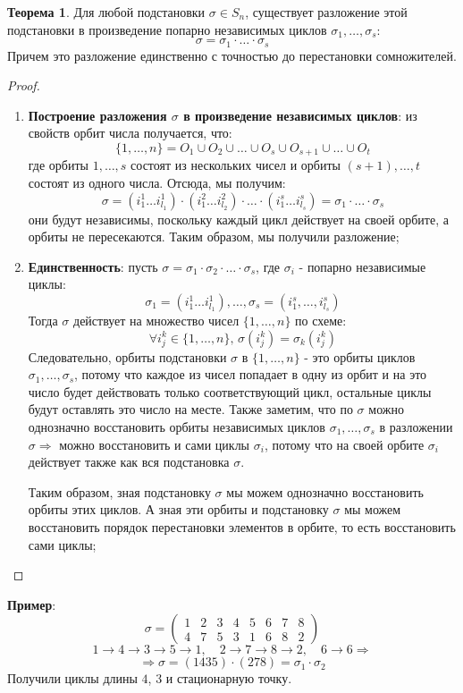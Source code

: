 \documentclass[12pt]{article}
\theoremstyle{definition}
\newtheorem{theorem}{Теорема}
\begin{document}
\begin{theorem}
	Для любой подстановки $\sigma \in S_n$, существует разложение этой подстановки в произведение попарно независимых циклов $\sigma_1, \dotsc,\sigma_s$: 
	$$
		\sigma = \sigma_1{\cdot}\dotsc{\cdot}\sigma_s
	$$
	Причем это разложение единственно с точностью до перестановки сомножителей.
\end{theorem}
\begin{proof}\hfill
	\begin{enumerate}[label=\arabic*)]
		\item \textbf{Построение разложения $\sigma$ в произведение независимых циклов}: из свойств орбит числа получается, что: 
		$$
			\{1,\dotsc,n\} = O_1 \cup O_2 \cup \dotsc \cup O_s \cup O_{s+1} \cup \dotsc \cup O_t
		$$ 
		где орбиты $1,\dotsc, s$ состоят из нескольких чисел и орбиты $(s+1), \dotsc, t$ состоят из одного числа. Отсюда, мы получим:
		$$
			\sigma = (i_1^1 \dotsc i_{l_1}^1){\cdot}(i_1^2 \dotsc i_{l_2}^2){\cdot}\dotsc{\cdot}(i_1^s \dotsc i_{l_s}^s) = \sigma_1{\cdot}\dotsc{\cdot}\sigma_s
		$$
		они будут независимы, поскольку каждый цикл действует на своей орбите, а орбиты не пересекаются. Таким образом, мы получили разложение;
		
		\item \textbf{Единственность}: пусть $\sigma = \sigma_1{\cdot}\sigma_2{\cdot}\dotsc{\cdot}\sigma_s$, где $\sigma_i$ - попарно независимые циклы: 
		$$
			\sigma_1 = (i_1^1 \dotsc i_{l_1}^1), \dotsc, \sigma_s =(i_1^s,\dotsc,i_{l_s}^s)
		$$
		Тогда $\sigma$ действует на множество чисел $\{1,\dotsc,n\}$ по схеме:
		$$
			\forall i_j^k \in \{1,\dotsc, n\}, \, \sigma(i_j^k) = \sigma_k(i_j^k)
		$$ 
		Следовательно, орбиты подстановки $\sigma$ в $\{1,\dotsc,n\}$ - это орбиты циклов $\sigma_1,\dotsc,\sigma_s$, потому что каждое из чисел попадает в одну из орбит и на это число будет действовать только соответствующий цикл, остальные циклы будут оставлять это число на месте.	Также заметим, что по $\sigma$ можно однозначно восстановить орбиты независимых циклов $\sigma_1, \dotsc, \sigma_s$ в разложении $\sigma \Rightarrow$ можно восстановить и сами циклы $\sigma_i$, потому что на своей орбите $\sigma_i$ действует также как вся подстановка $\sigma$.
		
		Таким образом, зная подстановку $\sigma$ мы можем однозначно восстановить орбиты этих циклов. А зная эти орбиты и подстановку $\sigma$ мы можем восстановить порядок перестановки элементов в орбите, то есть восстановить сами циклы;
	\end{enumerate}
\end{proof}

\textbf{Пример}: 
$$
	\sigma = 
	\begin{pmatrix}
		1 & 2 & 3 & 4 & 5 & 6 & 7 & 8\\
		4 & 7 & 5 & 3 & 1 & 6 & 8 & 2
	\end{pmatrix}
$$
$$
	1 \to 4 \to 3 \to 5 \to 1, \quad 2 \to 7 \to 8 \to 2, \quad 6 \to 6 \Rightarrow
$$
$$
	\Rightarrow \sigma = (1435){\cdot}(278) = \sigma_1{\cdot}\sigma_2
$$
Получили циклы длины $4$, $3$ и стационарную точку.
\end{document}
